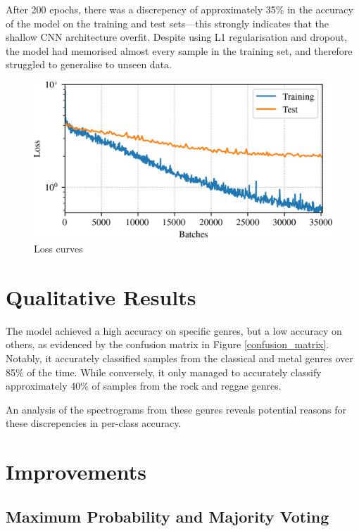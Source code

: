 \documentclass[conference]{IEEEtran}
\begin{document}
After 200 epochs, there was a discrepency of approximately 35\% in the accuracy of the model on the training and test sets---this strongly indicates that the shallow CNN architecture overfit.
Despite using L1 regularisation and dropout, the model had memorised almost every sample in the training set, and therefore struggled to generalise to unseen data.

\begin{figure}[htbp]
    \centerline{\includegraphics[width=\columnwidth]{loss.png}}
    \caption{Loss curves}
    \label{loss_curves}
\end{figure}

\section{Qualitative Results}

The model achieved a high accuracy on specific genres, but a low accuracy on others, as evidenced by the confusion matrix in Figure \ref{confusion_matrix}.
Notably, it accurately classified samples from the classical and metal genres over 85\% of the time.
While conversely, it only managed to accurately classify approximately 40\% of samples from the rock and reggae genres.

An analysis of the spectrograms from these genres reveals potential reasons for these discrepencies in per-class accuracy.

\section{Improvements}

\subsection{Maximum Probability and Majority Voting}
\end{document}
